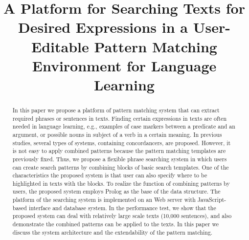 \documentclass[conference]{IEEEtran}
\begin{document}
\title{A Platform for Searching Texts for Desired Expressions in a User-Editable Pattern Matching Environment for Language Learning\\
}

\author{
\and
{}
}



\maketitle

\begin{abstract}
In this paper we propose a platform of pattern matching system that can extract required phrases or sentences in texts.
Finding certain expressions in texts are often needed in language learning, e.g., examples of case markers
between a predicate and an argument, or possible nouns in subject of a verb in a certain meaning. In previous studies,
several types of systems, containing concordancers, are proposed. However, it is not easy to apply combined
patterns because the pattern matching templates are previously fixed.
Thus, we propose a flexible phrase searching system in which users can create search patterns
by combining blocks of basic search templates. %
One of the characteristics the proposed system is that user can also specify where to be highlighted
in texts with the blocks.
To realize the function of combining patterns by users, the proposed system employs
Prolog as the base of the data structure. The platform of the searching system is implemented
on an Web server with JavaScript-based interface and database system. 
In the performance test, we show that the proposed system can deal with relatively large scale texts
(10,000 sentences), and also demonstrate the combined patterns can be applied to the texts.
In this paper we discuss the system architecture and the extendability of the pattern matching. 
\end{abstract}
\end{document}
